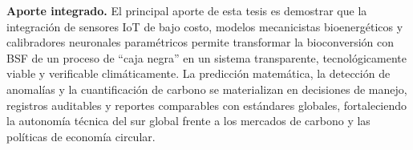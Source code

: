 \textbf{Aporte integrado.} El principal aporte de esta tesis es demostrar que la integración de sensores IoT de bajo costo, modelos mecanicistas bioenergéticos y calibradores neuronales paramétricos permite transformar la bioconversión con BSF de un proceso de ``caja negra'' en un sistema transparente, tecnológicamente viable y verificable climáticamente. La predicción matemática, la detección de anomalías y la cuantificación de carbono se materializan en decisiones de manejo, registros auditables y reportes comparables con estándares globales, fortaleciendo la autonomía técnica del sur global frente a los mercados de carbono y las políticas de economía circular.
